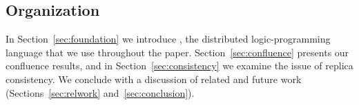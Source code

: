 \subsection{Organization}
In Section~\ref{sec:foundation} we introduce \lang, the distributed logic-programming language that we use throughout the paper.  Section~\ref{sec:confluence} presents our confluence results, and in Section~\ref{sec:consistency} we examine the issue of replica consistency.    We conclude with a discussion of related and future work (Sections~\ref{sec:relwork} and~\ref{sec:conclusion}).